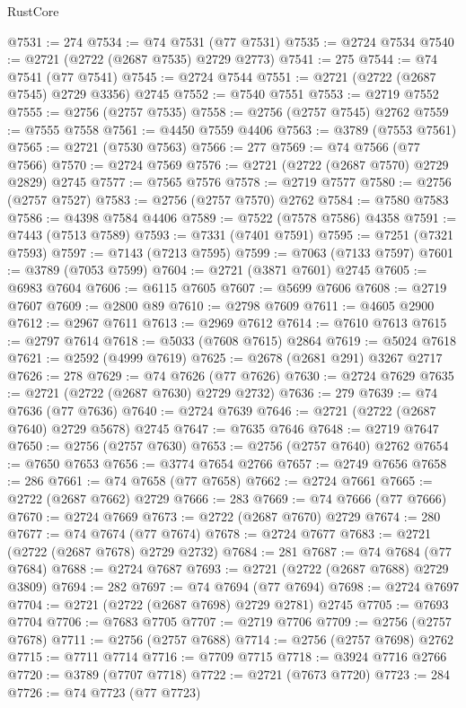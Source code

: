 \begin{lexlean}{RustCore}
\begin{coremodule}
@7531 := 274
@7534 := @74 @7531 (@77 @7531)
@7535 := @2724 @7534
@7540 := @2721 (@2722 (@2687 @7535) @2729 @2773)
@7541 := 275
@7544 := @74 @7541 (@77 @7541)
@7545 := @2724 @7544
@7551 := @2721 (@2722 (@2687 @7545) @2729 @3356) @2745
@7552 := @7540 @7551
@7553 := @2719 @7552
@7555 := @2756 (@2757 @7535)
@7558 := @2756 (@2757 @7545) @2762
@7559 := @7555 @7558
@7561 := @4450 @7559 @4406
@7563 := @3789 (@7553 @7561)
@7565 := @2721 (@7530 @7563)
@7566 := 277
@7569 := @74 @7566 (@77 @7566)
@7570 := @2724 @7569
@7576 := @2721 (@2722 (@2687 @7570) @2729 @2829) @2745
@7577 := @7565 @7576
@7578 := @2719 @7577
@7580 := @2756 (@2757 @7527)
@7583 := @2756 (@2757 @7570) @2762
@7584 := @7580 @7583
@7586 := @4398 @7584 @4406
@7589 := @7522 (@7578 @7586) @4358
@7591 := @7443 (@7513 @7589)
@7593 := @7331 (@7401 @7591)
@7595 := @7251 (@7321 @7593)
@7597 := @7143 (@7213 @7595)
@7599 := @7063 (@7133 @7597)
@7601 := @3789 (@7053 @7599)
@7604 := @2721 (@3871 @7601) @2745
@7605 := @6983 @7604
@7606 := @6115 @7605
@7607 := @5699 @7606
@7608 := @2719 @7607
@7609 := @2800 @89
@7610 := @2798 @7609
@7611 := @4605 @2900
@7612 := @2967 @7611
@7613 := @2969 @7612
@7614 := @7610 @7613
@7615 := @2797 @7614
@7618 := @5033 (@7608 @7615) @2864
@7619 := @5024 @7618
@7621 := @2592 (@4999 @7619)
@7625 := @2678 (@2681 @291) @3267 @2717
@7626 := 278
@7629 := @74 @7626 (@77 @7626)
@7630 := @2724 @7629
@7635 := @2721 (@2722 (@2687 @7630) @2729 @2732)
@7636 := 279
@7639 := @74 @7636 (@77 @7636)
@7640 := @2724 @7639
@7646 := @2721 (@2722 (@2687 @7640) @2729 @5678) @2745
@7647 := @7635 @7646
@7648 := @2719 @7647
@7650 := @2756 (@2757 @7630)
@7653 := @2756 (@2757 @7640) @2762
@7654 := @7650 @7653
@7656 := @3774 @7654 @2766
@7657 := @2749 @7656
@7658 := 286
@7661 := @74 @7658 (@77 @7658)
@7662 := @2724 @7661
@7665 := @2722 (@2687 @7662) @2729
@7666 := 283
@7669 := @74 @7666 (@77 @7666)
@7670 := @2724 @7669
@7673 := @2722 (@2687 @7670) @2729
@7674 := 280
@7677 := @74 @7674 (@77 @7674)
@7678 := @2724 @7677
@7683 := @2721 (@2722 (@2687 @7678) @2729 @2732)
@7684 := 281
@7687 := @74 @7684 (@77 @7684)
@7688 := @2724 @7687
@7693 := @2721 (@2722 (@2687 @7688) @2729 @3809)
@7694 := 282
@7697 := @74 @7694 (@77 @7694)
@7698 := @2724 @7697
@7704 := @2721 (@2722 (@2687 @7698) @2729 @2781) @2745
@7705 := @7693 @7704
@7706 := @7683 @7705
@7707 := @2719 @7706
@7709 := @2756 (@2757 @7678)
@7711 := @2756 (@2757 @7688)
@7714 := @2756 (@2757 @7698) @2762
@7715 := @7711 @7714
@7716 := @7709 @7715
@7718 := @3924 @7716 @2766
@7720 := @3789 (@7707 @7718)
@7722 := @2721 (@7673 @7720)
@7723 := 284
@7726 := @74 @7723 (@77 @7723)

\end{coremodule}
\end{lexlean}
